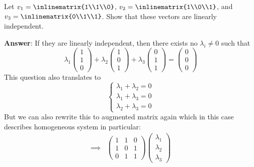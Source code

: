 \begin{exm}\label{exm-show-linearly-independency}
	Let
	$v_1=\inlinematrix{1\\1\\0}$, $v_2=\inlinematrix{1\\0\\1}$, and
	$v_3=\inlinematrix{0\\1\\1}$. Show that these vectors are linearly independent.
	\begin{flushleft}
		\textbf{Answer}: If they are linearly independent, then there exists no
		$\lambda_i\neq0$ such that
		\begin{equation*}
			\lambda_1\begin{pmatrix}
				1 \\1\\0
			\end{pmatrix}+\lambda_2\begin{pmatrix}
				1 \\0\\1
			\end{pmatrix}+\lambda_3\begin{pmatrix}
				0 \\1\\1
			\end{pmatrix}=
			\begin{pmatrix}
				0 \\0\\0
			\end{pmatrix}
		\end{equation*}
		This question also translates to
		\begin{equation*}
			\begin{cases}
				\lambda_1 + \lambda_2 = 0 \\
				\lambda_1 + \lambda_3 = 0 \\
				\lambda_2 + \lambda_3 = 0
			\end{cases}
		\end{equation*}
		But we can also rewrite this to augmented matrix again which in this case
		describes homogeneous system in particular:
		\begin{align*}
			\implies & \begin{pmatrix}
				1 & 1 & 0 \\
				1 & 0 & 1 \\
				0 & 1 & 1
			\end{pmatrix}
			\begin{pmatrix}
				\lambda_1 \\ \lambda_2 \\ \lambda_3

\end{pmatrix}
\end{align*}
\end{flushleft}
\end{exm}
